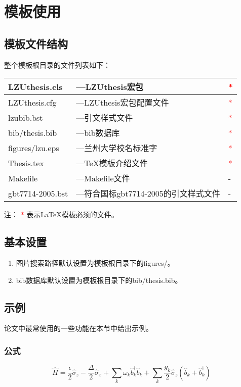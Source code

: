 \documentclass{LZUthesis}
\begin{document}
\chapter{模板使用}
\section{模板文件结构\label{sec:files}}
整个模板根目录的文件列表如下：

\begin{tabular}{|l|l|l|}
\hline
LZUthesis.cls & ---LZUthesis宏包 & \textcolor{red}{{*}}\\
\hline
LZUthesis.cfg & ---LZUthesis宏包配置文件 & \textcolor{red}{{*}}\\
\hline
lzubib.bst & ---引文样式文件 & \textcolor{red}{{*}}\\
\hline
bib/thesis.bib & ---bib数据库 & \textcolor{red}{{*}}\\
\hline
figures/lzu.eps & ---兰州大学校名标准字 & \textcolor{red}{{*}}\\
\hline
Thesis.tex & ---\TeX{}模板介绍文件 &\textcolor{red}{{*}}\\
\hline
Makefile & ---Makefile文件 & -\\
\hline
gbt7714-2005.bst & ---符合国标gbt7714-2005的引文样式文件 & -\\
\hline
\end{tabular}

注： \textcolor{red}{{*}} 表示\LaTeX{}模板必须的文件。


\section{基本设置}
\begin{enumerate}
\item 图片搜索路径默认设置为模板根目录下的figures/。
\item bib数据库默认设置为模板根目录下的bib/thesis.bib。
\end{enumerate}


\section{示例}
论文中最常使用的一些功能在本节中给出示例。

\subsection{公式}
\begin{equation}
\hat{H}=\frac{\epsilon}{2}\hat{\sigma}_{z}-\frac{\Delta}{2}\hat{\sigma}_{x}+\sum_{k}\omega_{k}\hat{b}_{k}^{\dagger}\hat{b}_{k}+\sum_{k}\frac{g_{k}}{2}\hat{\sigma}_{z}(\hat{b}_{k}+\hat{b}_{k}^{\dagger})\label{eq:sbm}
\end{equation}
\end{document}
